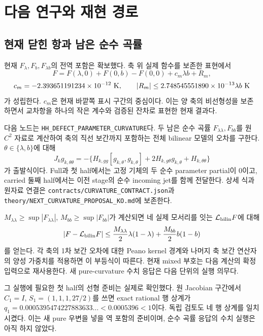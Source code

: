 \clearpage
\section{다음 연구와 재현 경로}

\subsection{현재 닫힌 항과 남은 순수 곡률}

현재 $F_\lambda,F_b,F_{\lambda b}$의 전역 포함은 확보했다.
축 위 실제 함수를 보존한 표현에서
\[
F=F(\lambda,0)+F(0,b)-F(0,0)+c_m\lambda b+R_m,
\]
\[
c_m=-2.393651191234\times10^{-12}\ {\rm K},\qquad
|R_m|\le2.748545551890\times10^{-13}\lambda b\ {\rm K}
\]
가 성립한다. $c_m$은 현재 바깥쪽 표시 구간의 중심이다.
이는 양 축의 비선형성을 보존하면서 교차항을 하나의 작은 계수와
검증된 잔차로 표현한 현재 결과다.

다음 노드는 \texttt{HH\_DEFECT\_PARAMETER\_CURVATURE}다.
두 남은 순수 곡률 $F_{\lambda\lambda},F_{bb}$를 원 $C^2$ 자료로
계산하여 축의 직선 보간까지 포함하는 전체 bilinear 모델의 오차를
구한다. $\theta\in\{\lambda,b\}$에 대해
\[
J_kg_{k,\theta\theta}
=-\{H_{k,gg}[g_{k,\theta},g_{k,\theta}]
+2H_{k,g\theta}g_{k,\theta}+H_{k,\theta\theta}\}
\]
가 출발식이다. Full과 첫 half에서는 고정 기체의 두 순수 parameter
partial이 0이고, carried 둘째 half에서는 이전 stage의 순수 incoming
jet를 함께 전달한다. 상세 식과 원자료 연결은
\nolinkurl{contracts/CURVATURE_CONTRACT.json}과
\nolinkurl{theory/NEXT_CURVATURE_PROPOSAL_KO.md}에 보존한다.

$M_{\lambda\lambda}\ge\sup|F_{\lambda\lambda}|$,
$M_{bb}\ge\sup|F_{bb}|$가 계산되면 네 실제 모서리를 잇는
$\mathcal L_{\rm bilin}F$에 대해
\begin{equation}
|F-\mathcal L_{\rm bilin}F|
\le\frac{M_{\lambda\lambda}}2\lambda(1-\lambda)
+\frac{M_{bb}}2b(1-b)
\label{eq:bilinear-remainder}
\end{equation}
를 얻는다. 각 축의 1차 보간 오차에 대한 Peano kernel 경계와
나머지 축 보간 연산자의 양성 가중치를 적용하면 이 부등식이 따른다.
현재 mixed 부호는 다음 계산의 확정 입력으로 재사용한다.
새 pure-curvature 수치 응답은 다음 단위의 실행 의무다.

그 실행에 필요한 첫 half의 선형 준비는 실제로 확인했다.
원 Jacobian 구간에서 $C_1=I$, $S_1=(1,1,1,27/2)$를 쓰면
exact rational 행 상계가
$q_1=0.0005395474227883633\ldots<0.0005396<1$이다.
독립 검토도 네 행 상계를 일치시켰다. 이는 새 pure 우변을 넣을
역 포함의 준비이며, 순수 곡률 응답의 수치 실행은 아직 하지 않았다.

